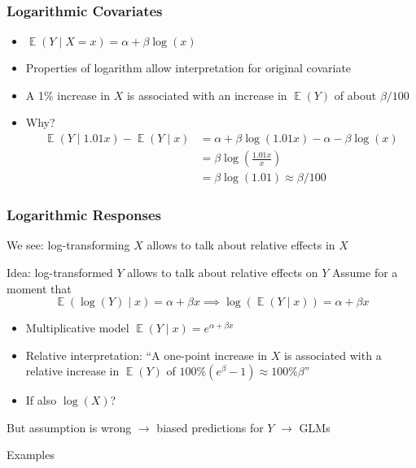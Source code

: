 \documentclass[
    utf8,
    aspectratio=169
]{beamer}  %
\DeclareMathOperator{\E}{\mathbb{E}}  %
\begin{document}
\begin{frame}
	\frametitle{Logarithmic Covariates}
	\begin{itemize}
		\item $\E(Y \mid X = x) = \alpha + \beta\log(x)$
		\item Properties of logarithm allow interpretation \alert{for original covariate}
		\item A 1\% increase in $X$ is associated with an increase in $\E(Y)$ of about $\beta/100$
		\item Why?
		\begin{align*}
			\E(Y\mid 1.01x) - \E(Y\mid x) &= \alpha + \beta \log (1.01x) - \alpha - \beta \log(x) \\
			&= \beta \log\left(\frac{1.01x}{x}\right) \\
			&= \beta \log(1.01) \approx \beta/100
		\end{align*}
		
		\vfill
		
		\begin{example}
		\end{example}
	\end{itemize}
\end{frame}

\begin{frame}
	\frametitle{Logarithmic Responses}
	We see: log-transforming $X$ allows to talk about relative effects in $X$
	
	\vfill
	
	\begin{block}{Idea: log-transformed $Y$ allows to talk about relative effects on $Y$}
		Assume for a moment that
		$$
		\E(\log(Y) \mid x) = \alpha + \beta x \implies \log(\E(Y \mid x)) = \alpha + \beta x
		$$
		\vspace*{-1.2em}
		\begin{itemize}
			\item Multiplicative model $\E(Y\mid x) = e^{\alpha + \beta x}$
			\item Relative interpretation: ``A one-point increase in $X$ is associated with a relative increase in $\E(Y)$ of $100\%(e^\beta - 1)\approx 100\% \beta$''
			\item If also $\log(X)$?
		\end{itemize}
	\end{block}
	
	\vfill
	
	But assumption is wrong $\rightarrow$ biased predictions for $Y$ $\rightarrow$ GLMs
	
	\vfill
	
	\begin{exampleblock}{Examples}
	\end{exampleblock}
\end{frame}
\end{document}
